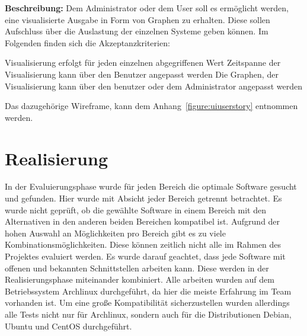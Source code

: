 {\textbf{Beschreibung:} Dem Administrator oder dem User soll es ermöglicht
werden, eine visualisierte Ausgabe in Form von Graphen zu erhalten. Diese
sollen Aufschluss über die Auslastung der einzelnen Systeme geben können. Im
Folgenden finden sich die Akzeptanzkriterien:

\begin{outline}
  \1 Visualisierung erfolgt für jeden einzelnen abgegriffenen Wert
  \1 Zeitspanne der Visualisierung kann über den Benutzer angepasst werden
  \1 Die Graphen, der Visualisierung kann über den benutzer oder dem
  Administrator angepasst werden
\end{outline}

Das dazugehörige Wireframe, kann dem Anhang~\ref{figure:uiuserstory}
entnommen werden.
\mr%

\chapter{Realisierung}
In der Evaluierungsphase wurde für jeden Bereich die optimale Software gesucht
und gefunden. Hier wurde mit Absicht jeder Bereich getrennt betrachtet. Es
wurde nicht geprüft, ob die gewählte Software in einem Bereich mit den
Alternativen in den anderen beiden Bereichen kompatibel ist. Aufgrund der hohen
Auswahl an Möglichkeiten pro Bereich gibt es zu viele
Kombinationsmöglichkeiten. Diese können zeitlich nicht alle im Rahmen des
Projektes evaluiert werden. Es wurde darauf geachtet, dass jede Software mit
offenen und bekannten Schnittstellen arbeiten kann. Diese werden in der
Realisierungsphase miteinander kombiniert. Alle arbeiten wurden auf dem
Betriebssystem Archlinux durchgeführt, da hier die meiste Erfahrung im Team
vorhanden ist. Um eine große Kompatibilität sicherzustellen wurden allerdings
alle Tests nicht nur für Archlinux, sondern auch für die Distributionen Debian,
Ubuntu und CentOS durchgeführt.

}

